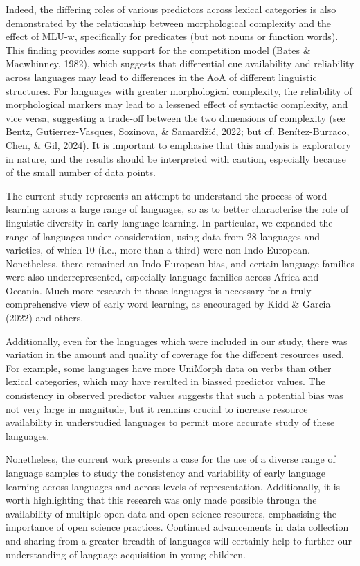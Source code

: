\documentclass[10pt, letterpaper]{article}
\begin{document}
Indeed, the differing roles of various predictors across lexical
categories is also demonstrated by the relationship between
morphological complexity and the effect of MLU-w, specifically for
predicates (but not nouns or function words). This finding provides some
support for the competition model (Bates \& Macwhinney, 1982), which
suggests that differential cue availability and reliability across
languages may lead to differences in the AoA of different linguistic
structures. For languages with greater morphological complexity, the
reliability of morphological markers may lead to a lessened effect of
syntactic complexity, and vice versa, suggesting a trade-off between the
two dimensions of complexity (see Bentz, Gutierrez-Vasques, Sozinova, \&
Samardžić, 2022; but cf. Benítez-Burraco, Chen, \& Gil, 2024). It is
important to emphasise that this analysis is exploratory in nature, and
the results should be interpreted with caution, especially because of
the small number of data points.

The current study represents an attempt to understand the process of
word learning across a large range of languages, so as to better
characterise the role of linguistic diversity in early language
learning. In particular, we expanded the range of languages under
consideration, using data from 28 languages and varieties, of which 10
(i.e., more than a third) were non-Indo-European. Nonetheless, there
remained an Indo-European bias, and certain language families were also
underrepresented, especially language families across Africa and
Oceania. Much more research in those languages is necessary for a truly
comprehensive view of early word learning, as encouraged by Kidd \&
Garcia (2022) and others.

Additionally, even for the languages which were included in our study,
there was variation in the amount and quality of coverage for the
different resources used. For example, some languages have more UniMorph
data on verbs than other lexical categories, which may have resulted in
biassed predictor values. The consistency in observed predictor values
suggests that such a potential bias was not very large in magnitude, but
it remains crucial to increase resource availability in understudied
languages to permit more accurate study of these languages.

Nonetheless, the current work presents a case for the use of a diverse
range of language samples to study the consistency and variability of
early language learning across languages and across levels of
representation. Additionally, it is worth highlighting that this
research was only made possible through the availability of multiple
open data and open science resources, emphasising the importance of open
science practices. Continued advancements in data collection and sharing
from a greater breadth of languages will certainly help to further our
understanding of language acquisition in young children.
\end{document}
